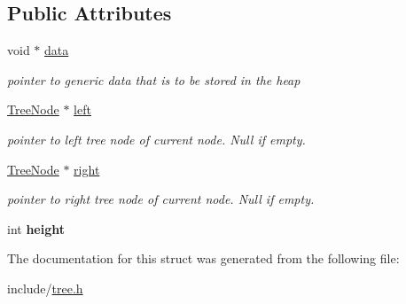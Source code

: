 \subsection*{Public Attributes}
\begin{DoxyCompactItemize}
\item 
\mbox{\label{structBalancedBinTreeNode_a60ea906ce13bc63ec829be82d9fed633}} 
void $\ast$ \hyperlink{structBalancedBinTreeNode_a60ea906ce13bc63ec829be82d9fed633}{data}
\begin{DoxyCompactList}\small\item\em pointer to generic data that is to be stored in the heap \end{DoxyCompactList}\item 
\mbox{\label{structBalancedBinTreeNode_a0cb8520a5b5b42c22472eaf5ea9084d7}} 
\hyperlink{tree_8h_a2215a7c79686526cfed9198a82cb295e}{Tree\+Node} $\ast$ \hyperlink{structBalancedBinTreeNode_a0cb8520a5b5b42c22472eaf5ea9084d7}{left}
\begin{DoxyCompactList}\small\item\em pointer to left tree node of current node. Null if empty. \end{DoxyCompactList}\item 
\mbox{\label{structBalancedBinTreeNode_a6bb5c0f6c7098ba3b003846e8fc739ca}} 
\hyperlink{tree_8h_a2215a7c79686526cfed9198a82cb295e}{Tree\+Node} $\ast$ \hyperlink{structBalancedBinTreeNode_a6bb5c0f6c7098ba3b003846e8fc739ca}{right}
\begin{DoxyCompactList}\small\item\em pointer to right tree node of current node. Null if empty. \end{DoxyCompactList}\item 
\mbox{\label{structBalancedBinTreeNode_acd64dda918a8d413103519903c6427ad}} 
int {\bfseries height}
\end{DoxyCompactItemize}


The documentation for this struct was generated from the following file\+:\begin{DoxyCompactItemize}
\item 
include/\hyperlink{tree_8h}{tree.\+h}\end{DoxyCompactItemize}
